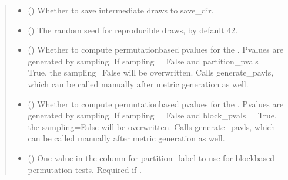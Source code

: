 \documentclass[letterpaper,10pt,english]{sphinxmanual}
\begin{document}
\begin{fulllineitems}
\begin{quote}
\begin{description}
\begin{itemize}
\item {} 
\sphinxAtStartPar
{} (\sphinxstyleliteralemphasis{\sphinxupquote{, }}) \textendash{} Whether to save intermediate draws to save\_dir.

\item {} 
\sphinxAtStartPar
{} (\sphinxstyleliteralemphasis{\sphinxupquote{,  }}) \textendash{} The random seed for reproducible draws, by default 42.

\item {} 
\sphinxAtStartPar
{} (\sphinxstyleliteralemphasis{\sphinxupquote{, }}) \textendash{} Whether to compute permutation\sphinxhyphen{}based p\sphinxhyphen{}values for the .
P\sphinxhyphen{}values are generated by sampling. If sampling = False and partition\_pvals = True,
the sampling=False will be overwritten.
Calls generate\_pavls, which can be called manually after metric generation as well.

\item {} 
\sphinxAtStartPar
{} (\sphinxstyleliteralemphasis{\sphinxupquote{, }}) \textendash{} Whether to compute permutation\sphinxhyphen{}based p\sphinxhyphen{}values for the .
P\sphinxhyphen{}values are generated by sampling. If sampling = False and block\_pvals = True,
the sampling=False will be overwritten.
Calls generate\_pavls, which can be called manually after metric generation as well.

\item {} 
\sphinxAtStartPar
{} (\sphinxstyleliteralemphasis{\sphinxupquote{,  }}) \textendash{} One value in the  column for partition\_label to use for block\sphinxhyphen{}based permutation tests.
Required if .


\end{itemize}
\end{description}
\end{quote}
\end{fulllineitems}
\end{document}

